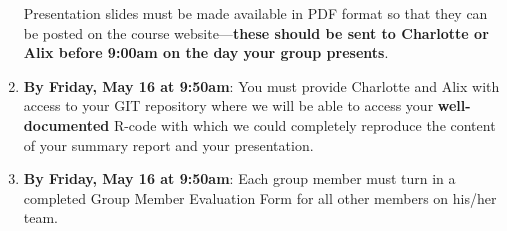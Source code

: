 \documentclass[12pt]{article}
\begin{document}
\begin{enumerate}
Presentation slides must be made available in PDF format so that they can be posted on the course website---{\bf these should be sent to Charlotte or Alix before 9:00am on the day your group presents}.

\item {\bf By Friday, May 16 at 9:50am}: You must provide Charlotte and Alix with access to your GIT repository where we will be able to access your {\bf well-documented} R-code with which we could completely reproduce the content of your summary report and your presentation. 

\item {\bf By Friday, May 16 at 9:50am}: Each group member must turn in a completed Group Member Evaluation Form for all other members on his/her team. 

\end{enumerate}
\end{document}
